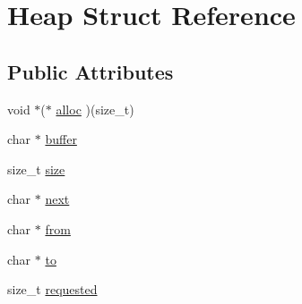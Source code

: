 \hypertarget{struct_heap}{\section{Heap Struct Reference}
\label{struct_heap}
}
\subsection*{Public Attributes}
\begin{DoxyCompactItemize}
\item 
void $\ast$($\ast$ \hyperlink{struct_heap_aa61a133febb2dd305213dfefba14e8dc}{alloc} )(size\-\_\-t)
\item 
char $\ast$ \hyperlink{struct_heap_a1debcfa580a04f58ac2c61b07f303598}{buffer}
\item 
size\-\_\-t \hyperlink{struct_heap_a2ed455b269f1a100c7130d6a7eb871a9}{size}
\item 
char $\ast$ \hyperlink{struct_heap_a1b1caa1636af47accf1716629aecc7a0}{next}
\item 
char $\ast$ \hyperlink{struct_heap_a8f8f5e1fd56997662075844c57a35631}{from}
\item 
char $\ast$ \hyperlink{struct_heap_aa99e63afb13d2a29913cd8a8198c41f2}{to}
\item 
size\-\_\-t \hyperlink{struct_heap_a5918805e8b229498a184496a7ca16b38}{requested}
\end{DoxyCompactItemize}


